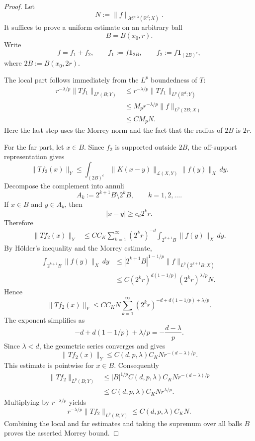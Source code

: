 \documentclass[11pt]{article}
\theoremstyle{definition}
\newcommand{\R}{\mathbb R}
\begin{document}
	\begin{proof}
		Let
		\[
		N:=\|f\|_{\mathcal M^{p,\lambda}(\R^d;X)}.
		\]
		It suffices to prove a uniform estimate on an arbitrary ball
		\[
		B=B(x_0,r).
		\]
		Write
		\[
		f=f_1+f_2,
		\qquad
		f_1:=f\mathbf 1_{2B},
		\qquad
		f_2:=f\mathbf 1_{(2B)^c},
		\]
		where $2B:=B(x_0,2r)$.

		The local part follows immediately from the $L^p$ boundedness of $T$:
		\[
		\begin{aligned}
		r^{-\lambda/p}\|Tf_1\|_{L^p(B;Y)}
		&\le
		r^{-\lambda/p}\|Tf_1\|_{L^p(\R^d;Y)} \\
		&\le
		M_p r^{-\lambda/p}\|f\|_{L^p(2B;X)} \\
		&\le
		C M_p N.
		\end{aligned}
		\]
		Here the last step uses the Morrey norm and the fact that the radius of $2B$ is $2r$.

		For the far part, let $x\in B$.  Since $f_2$ is supported outside $2B$, the off-support representation gives
		\[
		\|Tf_2(x)\|_Y
		\le
		\int_{(2B)^c}\|K(x-y)\|_{\mathcal L(X,Y)}\|f(y)\|_X\,dy.
		\]
		Decompose the complement into annuli
		\[
		A_k:=2^{k+1}B\setminus 2^kB,
		\qquad k=1,2,\dots.
		\]
		If $x\in B$ and $y\in A_k$, then
		\[
		|x-y|\ge c_d 2^k r.
		\]
		Therefore
		\[
		\begin{aligned}
		\|Tf_2(x)\|_Y
		&\le
		C C_K\sum_{k=1}^\infty (2^k r)^{-d}
		\int_{2^{k+1}B}\|f(y)\|_X\,dy .
		\end{aligned}
		\]
		By H\"older's inequality and the Morrey estimate,
		\[
		\begin{aligned}
		\int_{2^{k+1}B}\|f(y)\|_X\,dy
		&\le
		|2^{k+1}B|^{1-1/p}
		\|f\|_{L^p(2^{k+1}B;X)} \\
		&\le
		C (2^k r)^{d(1-1/p)}(2^k r)^{\lambda/p}N.
		\end{aligned}
		\]
		Hence
		\[
		\|Tf_2(x)\|_Y
		\le
		C C_K N
		\sum_{k=1}^\infty (2^k r)^{-d+d(1-1/p)+\lambda/p}.
		\]
		The exponent simplifies as
		\[
		-d+d(1-1/p)+\lambda/p
		=-\frac{d-\lambda}{p}.
		\]
		Since $\lambda<d$, the geometric series converges and gives
		\[
		\|Tf_2(x)\|_Y
		\le
		C(d,p,\lambda) C_K N r^{-(d-\lambda)/p}.
		\]
		This estimate is pointwise for $x\in B$.  Consequently
		\[
		\begin{aligned}
		\|Tf_2\|_{L^p(B;Y)}
		&\le
		|B|^{1/p}
		C(d,p,\lambda) C_K N r^{-(d-\lambda)/p} \\
		&\le
		C(d,p,\lambda) C_K N r^{\lambda/p}.
		\end{aligned}
		\]
		Multiplying by $r^{-\lambda/p}$ yields
		\[
		r^{-\lambda/p}\|Tf_2\|_{L^p(B;Y)}
		\le
		C(d,p,\lambda)C_K N.
		\]
		Combining the local and far estimates and taking the supremum over all balls $B$ proves the asserted Morrey bound.
	\end{proof}
\end{document}
